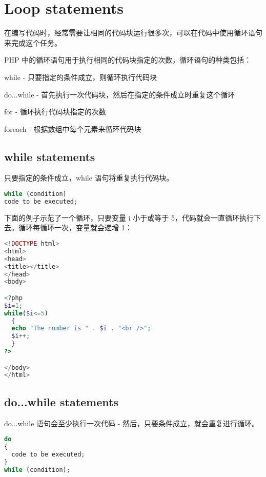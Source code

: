 \section{Loop statements}



在编写代码时，经常需要让相同的代码块运行很多次，可以在代码中使用循环语句来完成这个任务。


PHP 中的循环语句用于执行相同的代码块指定的次数，循环语句的种类包括：


\begin{compactitem}
\item while - 只要指定的条件成立，则循环执行代码块
\item do...while - 首先执行一次代码块，然后在指定的条件成立时重复这个循环
\item for - 循环执行代码块指定的次数
\item foreach - 根据数组中每个元素来循环代码块
\end{compactitem}



\subsection{while statements}

只要指定的条件成立，while 语句将重复执行代码块。


\begin{lstlisting}[language=PHP]
while (condition)
code to be executed;
\end{lstlisting}

下面的例子示范了一个循环，只要变量 i 小于或等于 5，代码就会一直循环执行下去。循环每循环一次，变量就会递增 1：

\begin{lstlisting}[language=PHP]
<!DOCTYPE html>
<html>
<head>
<title></title>
</head>
<body>

<?php 
$i=1;
while($i<=5)
  {
  echo "The number is " . $i . "<br />";
  $i++;
  }
?>

</body>
</html>
\end{lstlisting}


\subsection{do...while statements}

do...while 语句会至少执行一次代码 - 然后，只要条件成立，就会重复进行循环。

\begin{lstlisting}[language=PHP]
do
{
  code to be executed;
}
while (condition); 
\end{lstlisting}

